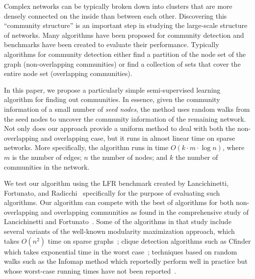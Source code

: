 Complex networks can be typically broken down into clusters that are
more densely connected on the inside than between each other. Discovering this ``community
structure'' is an important step in studying the large-scale structure of
networks. Many algorithms have been proposed for community detection and
benchmarks have been created to evaluate their performance. Typically algorithms
for community detection either find a partition of the node set of the graph
(non-overlapping communities) or find a collection of sets that cover the entire
node set (overlapping communities). 

In this paper, we propose a particularly simple semi-supervised learning
algorithm for finding out communities. In essence, given the community
information of a small number of \emph{seed nodes}, the method uses random walks
from the seed nodes to uncover the community information of the remaining
network.  Not only does our approach provide a uniform method to deal with both the 
non-overlapping and overlapping case, but it runs in almost linear time on sparse 
networks. More specifically, the algorithm runs in time $O(k \cdot m \cdot \log n)$, 
where $m$ is the number of edges; $n$ the number of nodes; and $k$ the number of communities
in the network.  

We test our algorithm using the LFR benchmark created by Lancichinetti,
Fortunato, and Radicchi~\cite{LFR08} specifically for the purpose of evaluating
such algorithms. Our algorithm can compete with the best of algorithms for both
non-overlapping and overlapping communities as found in the comprehensive study
of Lancichinetti and Fortunato~\cite{LF09}. Some of the algorithms in that study
include several variants of the well-known modularity maximization approach,
which takes $O(n^2)$ time on sparse graphs~\cite{RCC04}; clique detection
algorithms such as Cfinder which takes exponential time in the worst
case~\cite{PDFV05}; techniques based on random walks such as the Infomap method
which reportedly perform well in practice but whose  worst-case running times
have not been reported~\cite{RB08}. 
